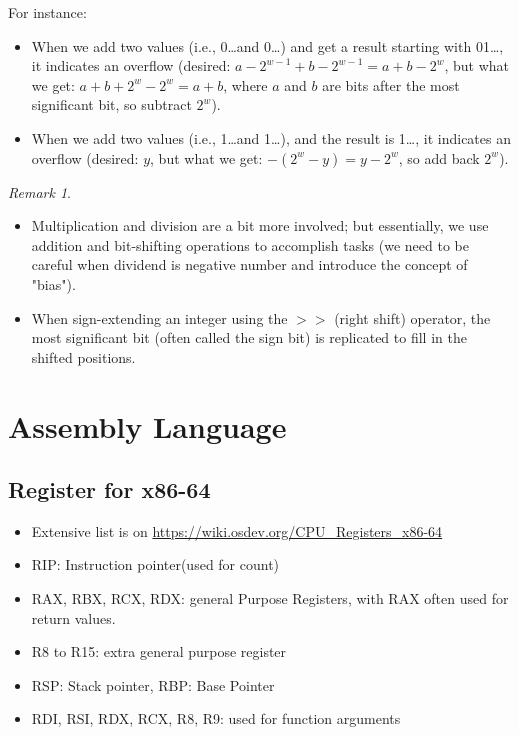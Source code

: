 \documentclass[11pt,reqno]{amsart}
\theoremstyle{remark}
\newtheorem{remark}[example]{Remark}
\begin{document}
For instance:
\begin{itemize}
    \item When we add two values (i.e., 0\ldots and 0\ldots) and get a result starting with 01\ldots, it indicates an overflow (desired: $a-2^{w-1}+b-2^{w-1}=a+b-2^w$, but what we get: $a+b+2^w-2^w=a+b$, where $a$ and $b$ are bits after the most significant bit, so subtract $2^w$).
    \item When we add two values (i.e., 1\ldots and 1\ldots), and the result is 1\ldots, it indicates an overflow (desired: $y$, but what we get: $-(2^w-y)=y-2^w$, so add back $2^w$).
\end{itemize}
\begin{remark}
\begin{itemize}
\item Multiplication and division are a bit more involved; but essentially, we use addition and bit-shifting operations to accomplish tasks (we need to be careful when dividend is negative number and introduce the concept of "bias"). 
\item When sign-extending an integer using the $>>$ (right shift) operator, the most significant bit (often called the sign bit) is replicated to fill in the shifted positions.
\end{itemize}
\end{remark}

\section*{Assembly Language}
\subsection*{Register for x86-64}
\begin{itemize}
\item Extensive list is on \url{https://wiki.osdev.org/CPU_Registers_x86-64}
\item RIP: Instruction pointer(used for count)
\item RAX, RBX, RCX, RDX: general Purpose Registers, with RAX often used for return values.
\item R8 to R15: extra general purpose register
\item RSP: Stack pointer, RBP: Base Pointer
\item RDI, RSI, RDX, RCX, R8, R9: used for function arguments
\end{itemize}
\end{document}
